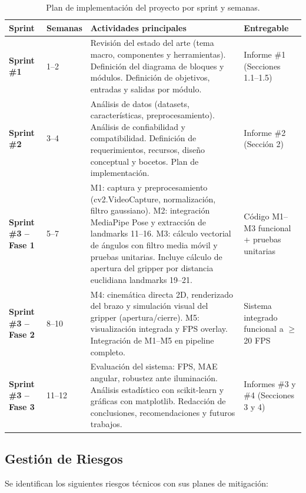 \begin{table}[H]
\centering
\label{tab:plan_impl}
\renewcommand{\arraystretch}{1.3}
\begin{tabularx}{\textwidth}{
    >{\bfseries}p{1.5cm}
    p{1.6cm}
    X
    p{3.5cm}
}
\toprule
\textbf{Sprint} &
\textbf{Semanas} &
\textbf{Actividades principales} &
\textbf{Entregable} \\
\midrule
Sprint \#1 & 1--2 &
  Revisión del estado del arte (tema macro, componentes y herramientas).
  Definición del diagrama de bloques y módulos. Definición de objetivos,
  entradas y salidas por módulo. &
  Informe \#1 (Secciones 1.1--1.5) \\
\midrule
Sprint \#2 & 3--4 &
  Análisis de datos (datasets, características, preprocesamiento).
  Análisis de confiabilidad y compatibilidad. Definición de
  requerimientos, recursos, diseño conceptual y bocetos. Plan de
  implementación. &
  Informe \#2 (Sección 2) \\
\midrule
Sprint \#3 -- Fase 1 & 5--7 &
  M1: captura y preprocesamiento (cv2.VideoCapture, normalización,
  filtro gaussiano). M2: integración MediaPipe Pose y extracción de
  landmarks 11--16. M3: cálculo vectorial de ángulos con filtro media
  móvil y pruebas unitarias. Incluye cálculo de apertura del gripper por distancia euclidiana landmarks 19–21. &
  Código M1--M3 funcional + pruebas unitarias \\
\midrule
Sprint \#3 -- Fase 2 & 8--10 &
  M4: cinemática directa 2D, renderizado del brazo y simulación visual del gripper (apertura/cierre). M5:
  visualización integrada y FPS overlay. Integración de M1--M5 en
  pipeline completo. &
  Sistema integrado funcional a $\geq$ 20 FPS \\
\midrule
Sprint \#3 -- Fase 3 & 11--12 &
  Evaluación del sistema: FPS, MAE angular, robustez ante iluminación.
  Análisis estadístico con scikit-learn y gráficas con matplotlib.
  Redacción de conclusiones, recomendaciones y futuros trabajos. &
  Informes \#3 y \#4 (Secciones 3 y 4) \\
\bottomrule
\end{tabularx}
\caption{Plan de implementación del proyecto por sprint y semanas.}
\end{table}

\subsection{Gestión de Riesgos}

Se identifican los siguientes riesgos técnicos con sus planes de
mitigación:

